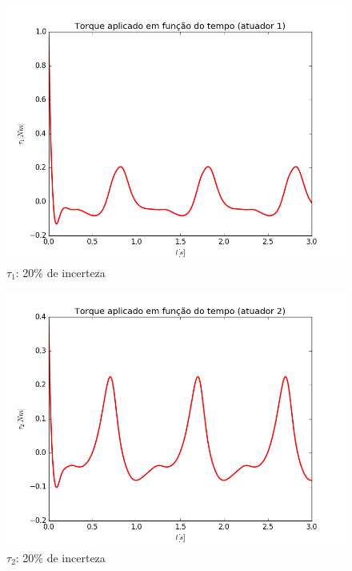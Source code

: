 \documentclass[]{politex}
\begin{document}
\begin{multicols}{2}
\begin{figure}[H]
	\centering
	\includegraphics[scale=0.42]{imagens/tau1_20.png}  
	\caption{$\tau_1$: 20\% de incerteza}
	\label{fig:Torque1_20}
\end{figure}
\begin{figure}[H]
	\centering
	\includegraphics[scale=0.42]{imagens/tau2_20.png}  
	\caption{$\tau_2$: 20\% de incerteza}
	\label{fig:Torque2_20}
\end{figure}
\end{multicols}
\end{document}
